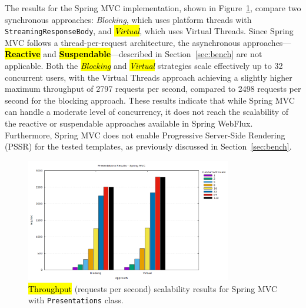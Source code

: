 \documentclass[software,article,accept,pdftex,moreauthors]{Definitions/mdpi}
\begin{document}
The results for the Spring MVC implementation, shown in
Figure~\ref{fig:presentations-springmvc-jmeter}, compare two synchronous
approaches: \textit{Blocking}, which uses platform threads with
\texttt{StreamingResponseBody}, and \textit{\hl{Virtual}}, which uses Virtual
Threads. Since Spring MVC follows a thread-per-request architecture, the
asynchronous approaches---\textbf{\hl{Reactive}} and \textbf{\hl{Suspendable}}---described in
Section~\ref{sec:bench} are not applicable. Both the \textit{\hl{Blocking}} and
\textit{\hl{Virtual}} strategies scale effectively up to 32 concurrent users, with
the Virtual Threads approach achieving a slightly higher maximum throughput of
2797 requests per second, compared to 2498 requests per second for the
blocking approach. These results indicate that while Spring MVC can handle a
moderate level of concurrency, it does not reach the scalability of the
reactive or suspendable approaches available in Spring WebFlux. Furthermore,
Spring MVC does not enable Progressive Server-Side Rendering (PSSR) for the
tested templates, as previously discussed in Section~\ref{sec:bench}.

\begin{figure}[H]
\vspace{-6pt}
     \includegraphics[width=0.8\textwidth]{./Graphs/presentations-springmvc-jmeter.png}
     \caption{\hl{Throughput} %
 (requests per second) scalability results for Spring MVC with \texttt{Presentations} class.}\label{fig:presentations-springmvc-jmeter}
\end{figure}
\end{document}
